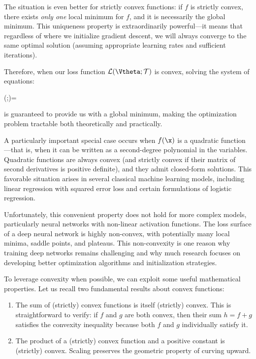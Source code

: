 The situation is even better for strictly convex functions: if $f$ is \alert{strictly convex}, there exists \emph{only one} local minimum for $f$, and it is necessarily the global minimum. This uniqueness property is extraordinarily powerful—it means that regardless of where we initialize gradient descent, we will always converge to the same optimal solution (assuming appropriate learning rates and sufficient iterations).

Therefore, when our loss function $\mathcal{L}(\Vtheta;\mathcal{T})$ is convex, solving the system of equations:
\begin{myequation}
    \nabla{}(\Vtheta;)=\Zero
\end{myequation}
is guaranteed to provide us with a global minimum, making the optimization problem tractable both theoretically and practically.

\medskip

A particularly important special case occurs when $f(\x)$ is a quadratic function—that is, when it can be written as a second-degree polynomial in the variables. Quadratic functions are always convex (and strictly convex if their matrix of second derivatives is positive definite), and they admit closed-form solutions. This favorable situation arises in several classical machine learning models, including linear regression with squared error loss and certain formulations of logistic regression.

Unfortunately, this convenient property does not hold for more complex models, particularly neural networks with non-linear activation functions. The loss surface of a deep neural network is highly non-convex, with potentially many local minima, saddle points, and plateaus. This non-convexity is one reason why training deep networks remains challenging and why much research focuses on developing better optimization algorithms and initialization strategies.

\medskip

To leverage convexity when possible, we can exploit some useful mathematical properties. Let us recall two fundamental results about convex functions:
\begin{enumerate}
\item The sum of (strictly) convex functions is itself (strictly) convex. This is straightforward to verify: if $f$ and $g$ are both convex, then their sum $h = f + g$ satisfies the convexity inequality because both $f$ and $g$ individually satisfy it.

\item The product of a (strictly) convex function and a positive constant is (strictly) convex. Scaling preserves the geometric property of curving upward.
\end{enumerate}


